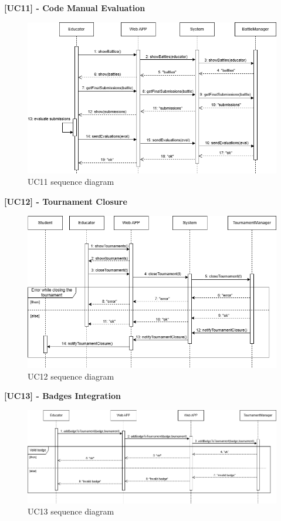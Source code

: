 \newpage

\textbf{[UC11] - Code Manual Evaluation}
\begin{figure}[H]
    \centering
    \includegraphics[width=1\linewidth]{Images/SD_ManualEval.png}
    \caption{UC11 sequence diagram}
    \label{fig:uc11}
\end{figure}

\textbf{[UC12] - Tournament Closure}
\begin{figure}[H]
    \centering
    \includegraphics[width=1\linewidth]{Images/SD_TournamentClosure.png}
    \caption{UC12 sequence diagram}
    \label{fig:uc12}
\end{figure}

\newpage

\textbf{[UC13] - Badges Integration}
\begin{figure}[H]
    \centering
    \includegraphics[width=1\linewidth]{Images/SD_BadgeDefinition.png}
    \caption{UC13 sequence diagram}
    \label{fig:uc13}
\end{figure}

